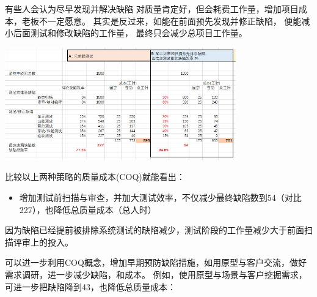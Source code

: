 有些人会认为尽早发现并解决缺陷
对质量肯定好，但会耗费工作量，增加项目成本，老板不一定愿意。
其实是反过来，如能在前面预先发现并修正缺陷，
便能减小后面测试和修改缺陷的工作量， 最终只会减少总项目工作量。


\includegraphics[width=10cm]{AR1FixVarCostScreenshot20221210144400.jpg}

比较以上两种策略的质量成本(COQ)就能看出：

\begin{itemize}
\tightlist
\item
  增加测试前扫描与审查，并加大测试效率，不仅减少最终缺陷数到54（对比227），也降低总质量成本（总人时）
\end{itemize}




因为缺陷已经提前被排除系统测试的缺陷减少，测试阶段的工作量减少大于前面扫描评审上的投入。

可以进一步利用COQ概念，增加早期预防缺陷措施，如用原型与客户交流，做好需求调研，进一步减少缺陷，和成本。
例如，使用原型与场景与客户挖掘需求，可进一步把缺陷降到43，也降低总质量成本：

